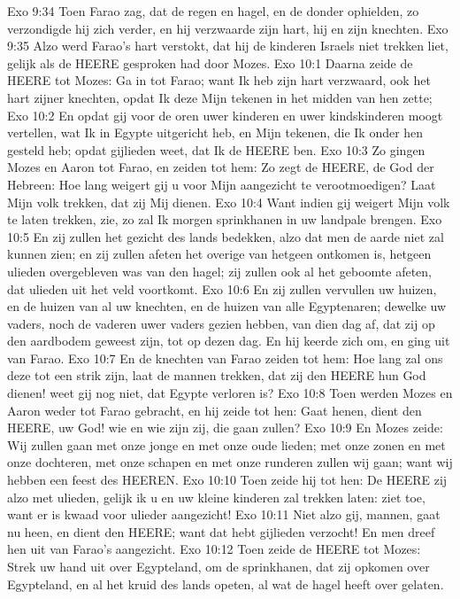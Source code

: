Exo 9:34  Toen Farao zag, dat de regen en hagel, en de donder ophielden, zo verzondigde hij zich verder, en hij verzwaarde zijn hart, hij en zijn knechten.
Exo 9:35  Alzo werd Farao's hart verstokt, dat hij de kinderen Israels niet trekken liet, gelijk als de HEERE gesproken had door Mozes.
Exo 10:1  Daarna zeide de HEERE tot Mozes: Ga in tot Farao; want Ik heb zijn hart verzwaard, ook het hart zijner knechten, opdat Ik deze Mijn tekenen in het midden van hen zette;
Exo 10:2  En opdat gij voor de oren uwer kinderen en uwer kindskinderen moogt vertellen, wat Ik in Egypte uitgericht heb, en Mijn tekenen, die Ik onder hen gesteld heb; opdat gijlieden weet, dat Ik de HEERE ben.
Exo 10:3  Zo gingen Mozes en Aaron tot Farao, en zeiden tot hem: Zo zegt de HEERE, de God der Hebreen: Hoe lang weigert gij u voor Mijn aangezicht te verootmoedigen? Laat Mijn volk trekken, dat zij Mij dienen.
Exo 10:4  Want indien gij weigert Mijn volk te laten trekken, zie, zo zal Ik morgen sprinkhanen in uw landpale brengen.
Exo 10:5  En zij zullen het gezicht des lands bedekken, alzo dat men de aarde niet zal kunnen zien; en zij zullen afeten het overige van hetgeen ontkomen is, hetgeen ulieden overgebleven was van den hagel; zij zullen ook al het geboomte afeten, dat ulieden uit het veld voortkomt.
Exo 10:6  En zij zullen vervullen uw huizen, en de huizen van al uw knechten, en de huizen van alle Egyptenaren; dewelke uw vaders, noch de vaderen uwer vaders gezien hebben, van dien dag af, dat zij op den aardbodem geweest zijn, tot op dezen dag. En hij keerde zich om, en ging uit van Farao.
Exo 10:7  En de knechten van Farao zeiden tot hem: Hoe lang zal ons deze tot een strik zijn, laat de mannen trekken, dat zij den HEERE hun God dienen! weet gij nog niet, dat Egypte verloren is?
Exo 10:8  Toen werden Mozes en Aaron weder tot Farao gebracht, en hij zeide tot hen: Gaat henen, dient den HEERE, uw God! wie en wie zijn zij, die gaan zullen?
Exo 10:9  En Mozes zeide: Wij zullen gaan met onze jonge en met onze oude lieden; met onze zonen en met onze dochteren, met onze schapen en met onze runderen zullen wij gaan; want wij hebben een feest des HEEREN.
Exo 10:10  Toen zeide hij tot hen: De HEERE zij alzo met ulieden, gelijk ik u en uw kleine kinderen zal trekken laten: ziet toe, want er is kwaad voor ulieder aangezicht!
Exo 10:11  Niet alzo gij, mannen, gaat nu heen, en dient den HEERE; want dat hebt gijlieden verzocht! En men dreef hen uit van Farao's aangezicht.
Exo 10:12  Toen zeide de HEERE tot Mozes: Strek uw hand uit over Egypteland, om de sprinkhanen, dat zij opkomen over Egypteland, en al het kruid des lands opeten, al wat de hagel heeft over gelaten.
